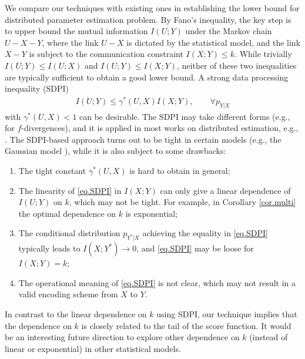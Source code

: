 \documentclass[final,12pt]{colt2018} %
\begin{document}
We compare our techniques with existing ones in establishing the lower bound for distributed parameter estimation problem. By Fano's inequality, the key step is to upper bound the mutual information $I(U;Y)$ under the Markov chain $U-X-Y$, where the link $U-X$ is dictated by the statistical model, and the link $X-Y$ is subject to the communication constraint $I(X;Y)\le k$. While trivially $I(U;Y)\le I(U;X)$ and $I(U;Y)\le I(X;Y)$, neither of these two inequalities are typically sufficient to obtain a good lower bound. A strong data processing inequality (SDPI)
\begin{align}\label{eq.SDPI}
I(U;Y) \le \gamma^*(U,X) I(X;Y), \qquad \forall p_{Y|X}
\end{align}
with $\gamma^*(U,X)<1$ can be desirable. The SDPI may take different forms (e.g., for $f$-divergences), and it is applied in most works on distributed estimation, e.g., \cite{zhang2013information,braverman2016communication,xu2017information}. The SDPI-based approach turns out to be tight in certain models (e.g., the Gaussian model \cite{zhang2013information,braverman2016communication}), while it is also subject to some drawbacks:
\begin{enumerate}
	\item The tight constant $\gamma^*(U,X)$ is hard to obtain in general;
	\item The linearity of \eqref{eq.SDPI} in $I(X;Y)$ can only give a linear dependence of $I(U;Y)$ on $k$, which may not be tight. For example, in Corollary \ref{cor.multi} the optimal dependence on $k$ is exponential;
	\item The conditional distribution $p_{Y^*|X}$ achieving the equality in \eqref{eq.SDPI} typically leads to $I(X;Y^*)\to 0$, and \eqref{eq.SDPI} may be loose for $I(X;Y)=k$;
	\item The operational meaning of \eqref{eq.SDPI} is not clear, which may not result in a valid encoding scheme from $X$ to $Y$.
\end{enumerate}

In contrast to the linear dependence on $k$ using SDPI, our technique implies that the dependence on $k$ is closely related to the tail of the score function. It would be an interesting future direction to explore other dependence on $k$ (instead of linear or exponential) in other statistical models.  

\clearpage 



\clearpage
\appendix
\end{document}

